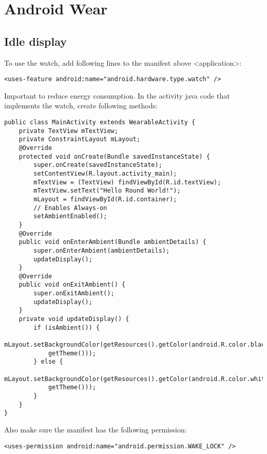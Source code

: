\documentclass[11pt]{article}
\begin{document}
\section{Android Wear}
\subsection{Idle display}
To use the watch, add following lines to the manifest above \textless application\textgreater :
\lstset{language = XML}
\begin{lstlisting}
<uses-feature android:name="android.hardware.type.watch" />
\end{lstlisting}

Important to reduce energy consumption. In the activity java code that implements the watch, create following methods: 
\lstset{language = Java}
\begin{lstlisting}
public class MainActivity extends WearableActivity {
    private TextView mTextView;
    private ConstraintLayout mLayout;
    @Override
    protected void onCreate(Bundle savedInstanceState) {
        super.onCreate(savedInstanceState);
        setContentView(R.layout.activity_main);
        mTextView = (TextView) findViewById(R.id.textView);
        mTextView.setText("Hello Round World!");
        mLayout = findViewById(R.id.container);
        // Enables Always-on
        setAmbientEnabled();
    }
    @Override
    public void onEnterAmbient(Bundle ambientDetails) {
        super.onEnterAmbient(ambientDetails);
        updateDisplay();
    }
    @Override
    public void onExitAmbient() {
        super.onExitAmbient();
        updateDisplay();
    }
    private void updateDisplay() {
        if (isAmbient()) {
            mLayout.setBackgroundColor(getResources().getColor(android.R.color.black,
            getTheme()));
        } else {
            mLayout.setBackgroundColor(getResources().getColor(android.R.color.white,
            getTheme()));
        }
    }
}
\end{lstlisting}
Also make sure the manifest has the following permission:
\lstset{language = XML}
\begin{lstlisting}
<uses-permission android:name="android.permission.WAKE_LOCK" />
\end{lstlisting}
\end{document}
